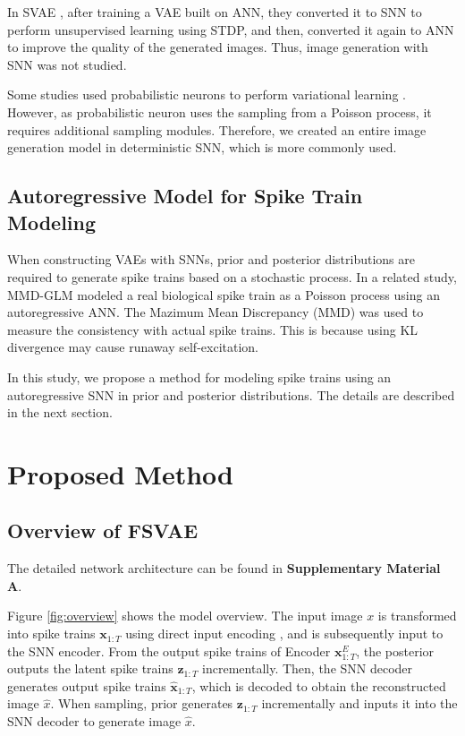 \documentclass[letterpaper]{article} %
\begin{document}
In SVAE \cite{svae}, after training a VAE built on ANN, they converted it to SNN to perform unsupervised learning using STDP, and then, converted it again to ANN to improve the quality of the generated images. Thus, image generation with SNN was not studied.

Some studies used probabilistic neurons to perform variational learning \cite{variationalsnn,probvae}. However, as probabilistic neuron uses the sampling from a Poisson process, it requires additional sampling modules.
Therefore, we created an entire image generation model in deterministic SNN, which is more commonly used.

\subsection{Autoregressive Model for Spike Train Modeling }
When constructing VAEs with SNNs, prior and posterior distributions are required to generate spike trains based on a stochastic process. In a related study, MMD-GLM \cite{mmdglm} modeled a real biological spike train as a Poisson process using an autoregressive ANN. The Mazimum Mean Discrepancy (MMD) was used to measure the consistency with actual spike trains. This is because using KL divergence may cause runaway self-excitation.

In this study, we propose a method for modeling spike trains using an autoregressive SNN in prior and posterior distributions. The details are described in the next section.

\section{Proposed Method}
\subsection{Overview of FSVAE}
The detailed network architecture can be found in \textbf{Supplementary Material A}.

Figure \ref{fig:overview} shows the model overview.
The input image $x$ is transformed into spike trains $\bm{x}_{1:T}$ using direct input encoding \cite{directencode}, and is subsequently input to the SNN encoder. From the output spike trains of Encoder $\bm{x}^E_{1:T}$, the posterior outputs the latent spike trains $\bm{z}_{1:T}$ incrementally. Then, the SNN decoder generates output spike trains $\hat{\bm{x}}_{1:T}$, which is decoded to obtain the reconstructed image $\hat{x}$.
When sampling, prior generates $\bm{z}_{1:T}$ incrementally and inputs it into the SNN decoder to generate image $\hat{x}$.
\end{document}
